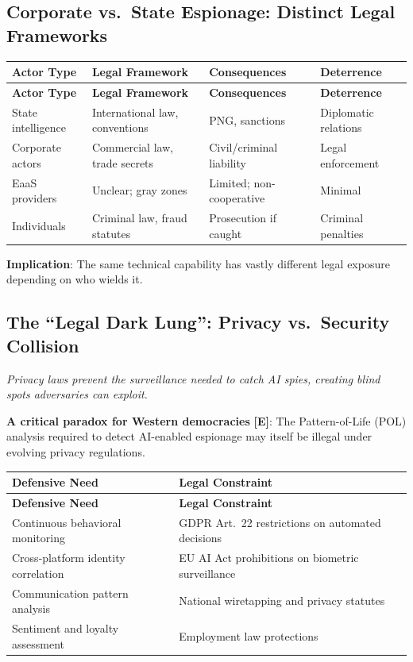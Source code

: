 \documentclass[11pt,letterpaper]{article}
\begin{document}
\subsection{Corporate vs.\ State Espionage: Distinct Legal Frameworks}

{\small
\begin{longtable}{L{2.5cm}L{3.5cm}L{3cm}L{3cm}}
\toprule
\textbf{Actor Type} & \textbf{Legal Framework} & \textbf{Consequences} & \textbf{Deterrence} \\
\midrule
\endfirsthead
\toprule
\textbf{Actor Type} & \textbf{Legal Framework} & \textbf{Consequences} & \textbf{Deterrence} \\
\midrule
\endhead
State intelligence & International law, conventions & PNG, sanctions & Diplomatic relations \\*
Corporate actors & Commercial law, trade secrets & Civil/criminal liability & Legal enforcement \\
EaaS providers & Unclear; gray zones & Limited; non-cooperative & Minimal \\*
Individuals & Criminal law, fraud statutes & Prosecution if caught & Criminal penalties \\
\bottomrule
\end{longtable}}

\textbf{Implication}: The same technical capability has vastly different legal exposure depending on who wields it.

\subsection{The ``Legal Dark Lung'': Privacy vs.\ Security Collision}

\textit{Privacy laws prevent the surveillance needed to catch AI spies, creating blind spots adversaries can exploit.}

\textbf{A critical paradox for Western democracies} \textbf{[E]}: The Pattern-of-Life (POL) analysis required to detect AI-enabled espionage may itself be illegal under evolving privacy regulations.

{\small
\begin{longtable}{L{5cm}L{6.5cm}}
\toprule
\textbf{Defensive Need} & \textbf{Legal Constraint} \\
\midrule
\endfirsthead
\toprule
\textbf{Defensive Need} & \textbf{Legal Constraint} \\
\midrule
\endhead
Continuous behavioral monitoring & GDPR Art.\ 22 restrictions on automated decisions \\*
Cross-platform identity correlation & EU AI Act prohibitions on biometric surveillance \\
Communication pattern analysis & National wiretapping and privacy statutes \\*
Sentiment and loyalty assessment & Employment law protections \\
\bottomrule
\end{longtable}}
\end{document}
